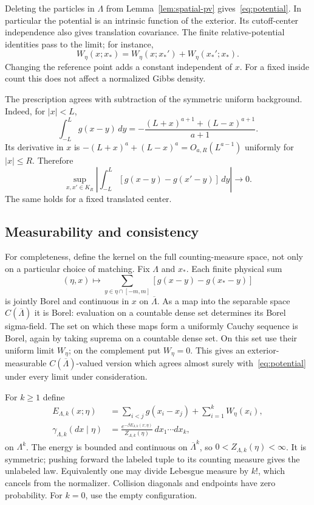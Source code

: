 \documentclass[11pt]{article}
\theoremstyle{remark}\newtheorem{remark}[theorem]{Remark}
\begin{document}
Deleting the particles in $\Lambda$ from Lemma~\ref{lem:spatial-pv}
gives~\eqref{eq:potential}. In particular the potential is an
intrinsic function of the exterior. Its cutoff-center independence
also gives translation covariance. The finite relative-potential
identities pass to the limit; for instance,
\begin{equation}\label{eq:potential-cocycle}
 W_\eta(x;x_*)=W_\eta(x;x_*')+W_\eta(x_*';x_*).
\end{equation}
Changing the reference point adds a constant independent of $x$.
For a fixed inside count this does not affect a normalized Gibbs
density.

The prescription agrees with subtraction of the symmetric uniform
background. Indeed, for $|x|<L$,
\[
 \int_{-L}^L g(x-y)\,dy
  =-\frac{(L+x)^{a+1}+(L-x)^{a+1}}{a+1}.
\]
Its derivative in $x$ is
$-(L+x)^a+(L-x)^a=O_{a,R}(L^{a-1})$ uniformly for
$|x|\le R$. Therefore
\begin{equation}\label{eq:background}
 \sup_{x,x'\in K_R}
 \left|\int_{-L}^L[g(x-y)-g(x'-y)]\,dy\right|
        \longrightarrow0.
\end{equation}
The same holds for a fixed translated center.

\subsection{Measurability and consistency}

For completeness, define the kernel on the full counting-measure
space, not only on a particular choice of matching. Fix $\Lambda$
and $x_*$. Each finite physical sum
\[
 (\eta,x)\longmapsto
 \sum_{y\in\eta\cap[-m,m]}[g(x-y)-g(x_*-y)]
\]
is jointly Borel and continuous in $x$ on $\overline\Lambda$.
As a map into the separable space $C(\overline\Lambda)$ it is
Borel: evaluation on a countable dense set determines its Borel
sigma-field. The set on which these maps form a uniformly Cauchy
sequence is Borel, again by taking suprema on a countable dense
set. On this set use their uniform limit $W_\eta$; on the
complement put $W_\eta=0$. This gives an exterior-measurable
$C(\overline\Lambda)$-valued version which agrees almost surely
with~\eqref{eq:potential} under every limit under consideration.

For $k\ge1$ define
\begin{align}
 E_{\Lambda,k}(x;\eta)
   &=\sum_{i<j}g(x_i-x_j)+\sum_{i=1}^kW_\eta(x_i),
                         \label{eq:canonical-energy}\\
 \gamma_{\Lambda,k}(dx\mid\eta)
   &=\frac{e^{-\beta E_{\Lambda,k}(x;\eta)}}
      {Z_{\Lambda,k}(\eta)}\,dx_1\cdots dx_k,
                         \label{eq:canonical-density}
\end{align}
on $\Lambda^k$. The energy is bounded and continuous on
$\overline\Lambda^k$, so $0<Z_{\Lambda,k}(\eta)<\infty$.
It is symmetric; pushing forward the labeled tuple to its counting
measure gives the unlabeled law. Equivalently one may divide
Lebesgue measure by $k!$, which cancels from the normalizer.
Collision diagonals and endpoints have zero probability.
For $k=0$, use the empty configuration.
\end{document}
